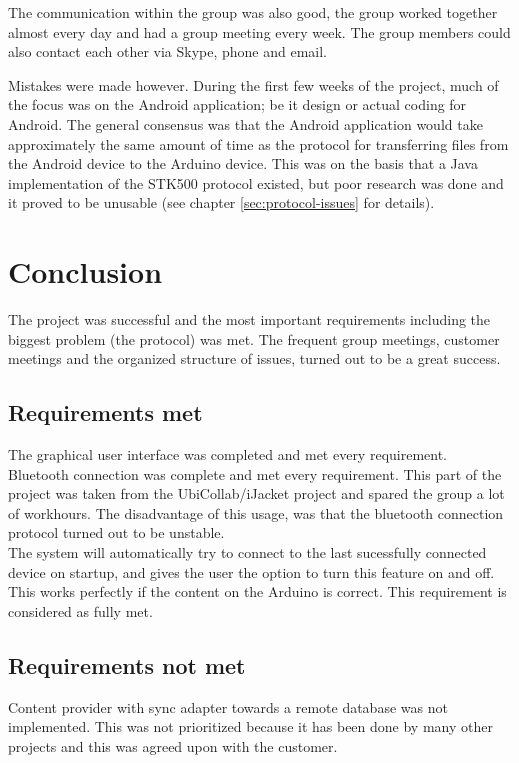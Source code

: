 	The communication within the group was also good, the group worked together almost every day and had a group meeting every week. The group members could also contact each other via Skype, phone and email.

	Mistakes were made however. During the first few weeks of the project, much of the focus was on the Android application; be it design or actual coding for Android. The general consensus was that the Android application would take approximately the same amount of time as the protocol for transferring files from the Android device to the Arduino device. This was on the basis that a Java implementation of the STK500 protocol existed, but poor research was done and it proved to be unusable (see chapter \ref{sec:protocol-issues} for details).


	\section{Conclusion}
    The project was successful and the most important requirements including the biggest problem (the protocol) was met. The frequent group meetings, customer meetings and the organized structure of issues, turned out to be a great success. \\

    	\subsection{Requirements met}
    		The graphical user interface was completed and met every requirement.\\

    		Bluetooth connection was complete and met every requirement. This part of the project was taken from the UbiCollab/iJacket project and spared the group a lot of workhours. The disadvantage of this usage, was that the bluetooth connection protocol turned out to be unstable.\\

    		The system will automatically try to connect to the last sucessfully connected device on startup, and gives the user the option to turn this feature on and off. This works perfectly if the content on the Arduino is correct. This requirement is considered as fully met.\\

		\subsection{Requirements not met}
			Content provider with sync adapter towards a remote database was not implemented. This was not prioritized because it has been done by many other projects and this was agreed upon with the customer. \\

